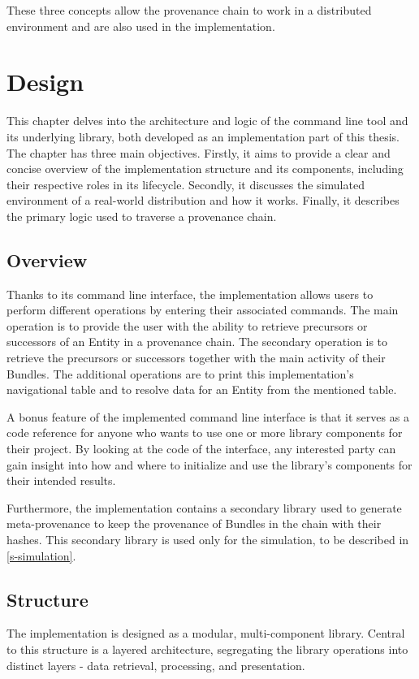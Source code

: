 \documentclass[
  digital,     %
  oneside,     %
  nosansbold,  %
  nocolorbold, %
  lof,         %
  lot,         %
]{fithesis4}
\begin{document}
These three concepts allow the provenance chain to work in a distributed environment and are also used in the implementation.


\chapter{Design}
\shorthandoff{-}
This chapter delves into the architecture and logic of the command line tool and its underlying library, both developed as an implementation part of this thesis. The chapter has three main objectives. Firstly, it aims to provide a clear and concise overview of the implementation structure and its components, including their respective roles in its lifecycle. Secondly, it discusses the simulated environment of a real-world distribution and how it works. Finally, it describes the primary logic used to traverse a provenance chain. 
\shorthandon{-}

\section{Overview}
Thanks to its command line interface, the implementation allows users to perform different operations by entering their associated commands. The main operation is to provide the user with the ability to retrieve precursors or successors of an Entity in a provenance chain. The secondary operation is to retrieve the precursors or successors together with the main activity of their Bundles. The additional operations are to print this implementation's navigational table and to resolve data for an Entity from the mentioned table.

A bonus feature of the implemented command line interface is that it serves as a code reference for anyone who wants to use one or more library components for their project. By looking at the code of the interface, any interested party can gain insight into how and where to initialize and use the library's components for their intended results.

Furthermore, the implementation contains a secondary library used to generate meta-provenance to keep the provenance of Bundles in the chain with their hashes. This secondary library is used only for the simulation, to be described in \ref{s-simulation}.

\section{Structure}
\shorthandoff{-}
The implementation is designed as a modular, multi-component library. Central to this structure is a layered architecture, segregating the library operations into distinct layers - data retrieval, processing, and presentation. 
\end{document}
